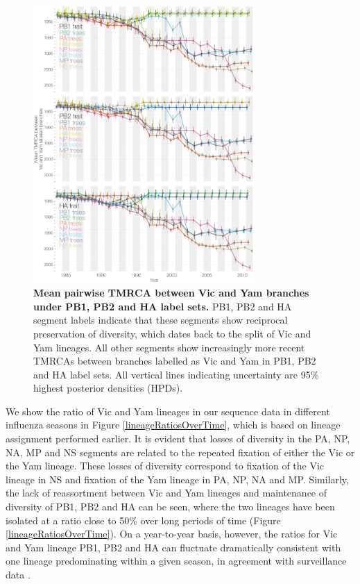 \documentclass[11pt,oneside,letterpaper]{article}
\begin{document}
\begin{figure}[h]
	\centering		
	\includegraphics[width=0.75\textwidth]{figures/InfB_betweenDiversity.png}
	\caption{\textbf{Mean pairwise TMRCA between Vic and Yam branches under PB1, PB2 and HA label sets.}
PB1, PB2 and HA segment labels indicate that these segments show reciprocal preservation of diversity, which dates back to the split of Vic and Yam lineages.
All other segments show increasingly more recent TMRCAs between branches labelled as Vic and Yam in PB1, PB2 and HA label sets.
All vertical lines indicating uncertainty are 95\% highest posterior densities (HPDs).}
	\label{betweenDiversity}
\end{figure}

We show the ratio of Vic and Yam lineages in our sequence data in different influenza seasons in Figure \ref{lineageRatiosOverTime}, which is based on lineage assignment performed earlier.
It is evident that losses of diversity in the PA, NP, NA, MP and NS segments are related to the repeated fixation of either the Vic or the Yam lineage.
These losses of diversity correspond to fixation of the Vic lineage in NS and fixation of the Yam lineage in PA, NP, NA and MP.
Similarly, the lack of reassortment between Vic and Yam lineages and maintenance of diversity of PB1, PB2 and HA can be seen, where the two lineages have been isolated at a ratio close to 50\% over long periods of time (Figure \ref{lineageRatiosOverTime}).
On a year-to-year basis, however, the ratios for Vic and Yam lineage PB1, PB2 and HA can fluctuate dramatically consistent with one lineage predominating within a given season, in agreement with surveillance data \cite{reed2012}.
\end{document}
